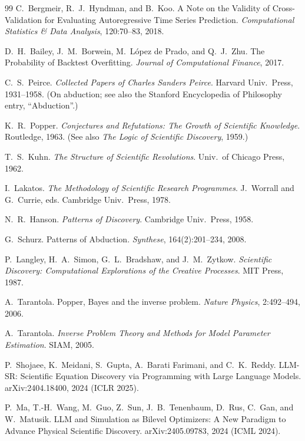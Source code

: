 \documentclass[11pt]{article}
\begin{document}
\begin{thebibliography}{99}
 C.~Bergmeir, R.~J.~Hyndman, and B.~Koo.
\newblock A Note on the Validity of Cross-Validation for Evaluating Autoregressive Time Series
Prediction.
\newblock \emph{Computational Statistics \& Data Analysis}, 120:70--83, 2018.

 D.~H.~Bailey, J.~M.~Borwein, M.~L\'opez de Prado, and Q.~J.~Zhu.
\newblock The Probability of Backtest Overfitting.
\newblock \emph{Journal of Computational Finance}, 2017.

 C.~S.~Peirce.
\newblock \emph{Collected Papers of Charles Sanders Peirce}. Harvard Univ.\ Press, 1931--1958.
\newblock (On abduction; see also the Stanford Encyclopedia of Philosophy entry, ``Abduction''.)

 K.~R.~Popper.
\newblock \emph{Conjectures and Refutations: The Growth of Scientific Knowledge}. Routledge, 1963.
\newblock (See also \emph{The Logic of Scientific Discovery}, 1959.)

 T.~S.~Kuhn.
\newblock \emph{The Structure of Scientific Revolutions}. Univ.\ of Chicago Press, 1962.

 I.~Lakatos.
\newblock \emph{The Methodology of Scientific Research Programmes}. J.~Worrall and G.~Currie, eds.
Cambridge Univ.\ Press, 1978.

 N.~R.~Hanson.
\newblock \emph{Patterns of Discovery}. Cambridge Univ.\ Press, 1958.

 G.~Schurz.
\newblock Patterns of Abduction. \emph{Synthese}, 164(2):201--234, 2008.

 P.~Langley, H.~A.~Simon, G.~L.~Bradshaw, and J.~M.~Zytkow.
\newblock \emph{Scientific Discovery: Computational Explorations of the Creative Processes}. MIT Press,
1987.

 A.~Tarantola.
\newblock Popper, Bayes and the inverse problem. \emph{Nature Physics}, 2:492--494, 2006.

 A.~Tarantola.
\newblock \emph{Inverse Problem Theory and Methods for Model Parameter Estimation}. SIAM, 2005.

 P.~Shojaee, K.~Meidani, S.~Gupta, A.~Barati Farimani, and C.~K.~Reddy.
\newblock LLM-SR: Scientific Equation Discovery via Programming with Large Language Models.
\newblock arXiv:2404.18400, 2024 (ICLR 2025).

 P.~Ma, T.-H.~Wang, M.~Guo, Z.~Sun, J.~B.~Tenenbaum, D.~Rus, C.~Gan, and W.~Matusik.
\newblock LLM and Simulation as Bilevel Optimizers: A New Paradigm to Advance Physical Scientific
Discovery.
\newblock arXiv:2405.09783, 2024 (ICML 2024).


\end{thebibliography}
\end{document}
